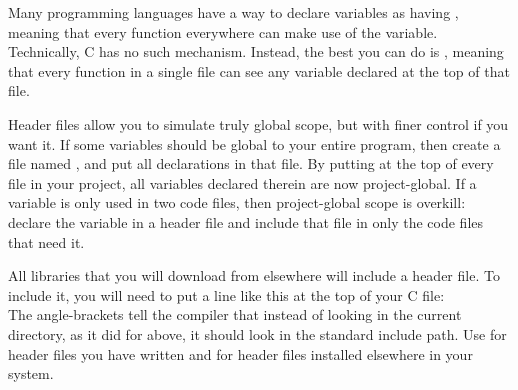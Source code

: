  \label{fileglobal}
Many programming languages have a way to declare variables as having
, meaning that every function everywhere can make use
of the variable. Technically, C has no such mechanism. Instead, the best
you can do is , meaning that every function in a
single file can see any variable declared at the top of that file.

Header files allow you to simulate truly global scope, but with finer
control if you want it. If some variables should be global to your
entire program, then create a file named , and put all
declarations in that file. By putting  at
the top of every file in your project, all variables declared therein
are now project-global.  If a variable is only used in two code files,
then project-global scope is overkill: declare the variable in a header
file and include that file in only the code files that need it.

All libraries that you will download from elsewhere will include a header file.
To include it, you will need to put a line like this at the top of your C file:
\\
The angle-brackets tell the compiler that instead of looking in the
current directory, as it did for  above, it should
look in the standard include path. Use  for header
files you have written and  for header files
installed elsewhere in your system.  


